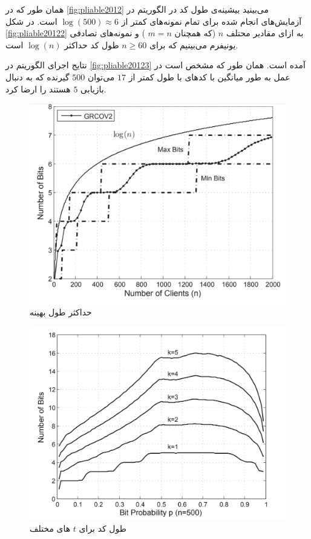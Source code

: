 همان طور که در
\autoref{fig:pliable2012}
می‌بینید بیشینه‌ی طول کد در الگوریتم
در آزمایش‌های انجام شده برای تمام نمونه‌های
\picod
کمتر از
$\log(500) \approx 6$
است. در شکل
\autoref{fig:pliable20122}
به ازای مقادیر محتلف 
$n$
(که همچنان
$m = n$
) و نمونه‌های تصادفی یونیفرم می‌بینیم که برای
$n \geq 60$
طول کد حداکثر
$\log(n)$
است.

نتایج اجرای الگوریتم
در 
\autoref{fig:pliable20123}
آمده است. همان طور که مشخص است در عمل به طور میانگین با کدهای با طول کمتر از
$17$
می‌توان 
$500$
گیرنده که به دنبال بازیابی 
$5$
هستند را ارضا کرد.
\begin{figure}
	\centering
	\includegraphics[width=0.7\linewidth]{figs/ch3/pliable2012_2}
	\caption[حداکثر طول بهینه
	]{
		حداکثر طول بهینه
		\cite{pliablefirstpaper}}
	\label{fig:pliable20122}
\end{figure}
\begin{figure}
	\centering
	\includegraphics[width=0.7\linewidth]{figs/ch3/pliable2012_3}
	\caption[
	طول کد برای
	$t$
	های مختلف
	]{
		طول کد برای
		$t$
		های مختلف
		\cite{pliablefirstpaper}}
	\label{fig:pliable20123}
\end{figure}

